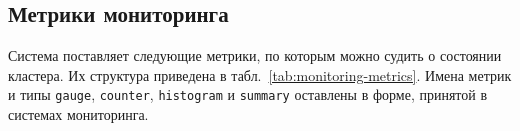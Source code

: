 \subsection{Метрики мониторинга}

Система поставляет следующие метрики, по которым можно судить о состоянии
кластера. Их структура приведена в табл.~\ref{tab:monitoring-metrics}.
Имена метрик и типы \texttt{gauge}, \texttt{counter}, \texttt{histogram} и
\texttt{summary} оставлены в форме, принятой в системах мониторинга.

\newcommand{\metriccell}[2]{%
\begin{tabular}[t]{@{}l@{}}
\texttt{#1}\\
\texttt{#2}
\end{tabular}}

\providecommand{\metriccell}[2]{%
\begin{tabular}[t]{@{}l@{}}
\texttt{#1}\\
\texttt{#2}
\end{tabular}}

